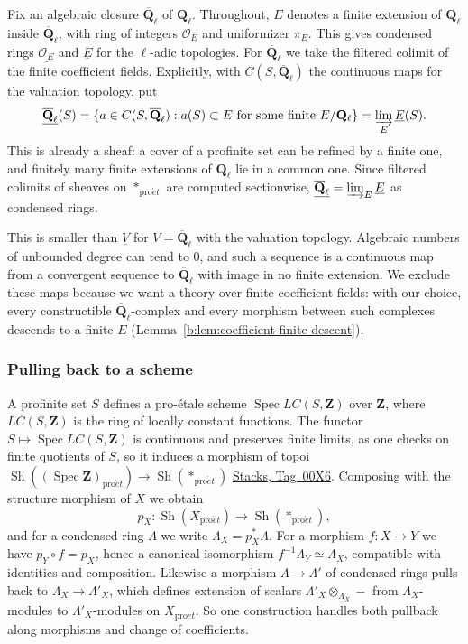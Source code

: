 \documentclass[11pt,a4paper]{article}
\numberwithin{equation}{section}
\theoremstyle{definition}
\theoremstyle{remark}
\newcommand{\Sh}{\operatorname{Sh}}
\newcommand{\Qbar}{\overline{\mathbf Q}_\ell}
\newcommand{\Ql}{\mathbf Q_\ell}
\newcommand{\proet}{\mathrm{pro}\acute{e}t}
\newcommand{\stacks}[1]{\href{https://stacks.math.columbia.edu/tag/#1}{\textnormal{Stacks, Tag~#1}}}
\begin{document}
Fix an algebraic closure $\Qbar$ of $\Ql$. Throughout, $E$ denotes a
finite extension of $\Ql$ inside $\Qbar$, with ring of integers
$\mathcal O_E$ and uniformizer $\pi_E$. This gives condensed rings
$\underline{\mathcal O_E}$ and $\underline E$ for the $\ell$-adic
topologies. For $\Qbar$ we take the filtered colimit of the finite
coefficient fields. Explicitly, with $C(S,\Qbar)$ the continuous maps
for the valuation topology, put
\[
 \underline{\Qbar}(S)=
 \{a\in C(S,\Qbar):a(S)\subset E\text{ for some finite }E/\Ql\}
 =\varinjlim_E\underline E(S).
\]
This is already a sheaf: a cover of a profinite set can be refined by a
finite one, and finitely many finite extensions of $\Ql$ lie in a common
one. Since
filtered colimits of sheaves on $*_{\proet}$ are computed sectionwise,
$\underline{\Qbar}=\varinjlim_E\underline E$ as condensed rings.

This is smaller than $\underline V$ for $V=\Qbar$ with the valuation
topology. Algebraic numbers of unbounded degree can tend to $0$, and
such a sequence is a continuous map from a convergent sequence to $\Qbar$
with image in no finite extension. We exclude these maps because we want
a theory over finite coefficient fields: with our choice, every
constructible $\Qbar$-complex and every morphism between such complexes
descends to a finite $E$ (Lemma~\ref{b:lem:coefficient-finite-descent}).

\subsubsection{Pulling back to a scheme}
A profinite set $S$ defines a pro-\'etale scheme
$\operatorname{Spec}LC(S,\mathbf Z)$ over $\mathbf Z$, where
$LC(S,\mathbf Z)$ is the ring of locally constant functions. The functor
$S\mapsto\operatorname{Spec}LC(S,\mathbf Z)$ is continuous and preserves
finite limits, as one checks on finite quotients of $S$, so it induces a
morphism of topoi $\Sh((\operatorname{Spec}\mathbf Z)_{\proet})\to
\Sh(*_{\proet})$ \stacks{00X6}. Composing with the structure morphism of
$X$ we obtain
\[
 p_X:\Sh(X_{\proet})\longrightarrow\Sh(*_{\proet}),
\]
and for a condensed ring $\Lambda$ we write $\Lambda_X=p_X^*\Lambda$.
For a morphism $f:X\to Y$ we have $p_Y\circ f=p_X$, hence a canonical
isomorphism $f^{-1}\Lambda_Y\simeq\Lambda_X$, compatible with identities
and composition. Likewise a morphism $\Lambda\to\Lambda'$ of condensed
rings pulls back to $\Lambda_X\to\Lambda'_X$, which defines extension of
scalars $\Lambda'_X\otimes_{\Lambda_X}-$ from $\Lambda_X$-modules to
$\Lambda'_X$-modules on $X_{\proet}$. So one construction handles both pullback
along morphisms and change of coefficients.
\end{document}
